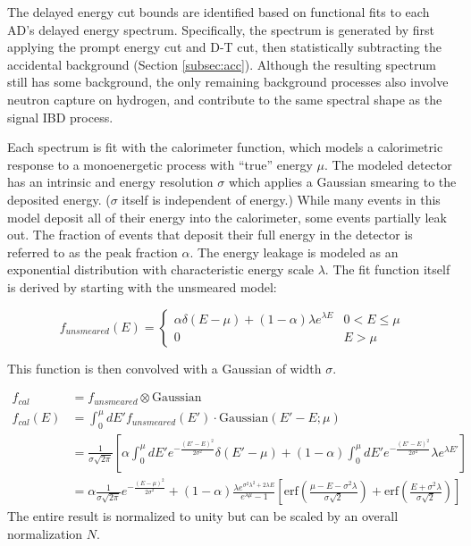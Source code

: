 \documentclass{ucbthesis}
\begin{document}
The delayed energy cut bounds are identified based on
functional fits to each AD's delayed energy spectrum.
Specifically, the spectrum is generated by first applying
the prompt energy cut and D-T cut,
then statistically subtracting the accidental background (Section \ref{subsec:acc}).
Although the resulting spectrum still has some background,
the only remaining background processes also involve
neutron capture on hydrogen, and contribute to the same spectral shape
as the signal IBD process.

Each spectrum is fit with the calorimeter function, which models
a calorimetric response to a monoenergetic process with ``true''
energy $\mu$.
The modeled detector has an intrinsic and energy resolution $\sigma$
which applies a Gaussian smearing to the deposited energy.
($\sigma$ itself is independent of energy.)
While many events in this model deposit all of their energy into
the calorimeter, some events partially leak out.
The fraction of events that deposit their full energy in the detector
is referred to as the peak fraction $\alpha$.
The energy leakage is modeled as an exponential distribution
with characteristic energy scale $\lambda$.
The fit function itself is derived by starting with
the unsmeared model:

\begin{equation*}
    f_{unsmeared}(E) =
    \begin{cases}
        \alpha\delta(E-\mu) + (1-\alpha)\lambda e^{\lambda E}
        & 0 < E \leq \mu \\
        0 & E > \mu
    \end{cases}
\end{equation*}

This function is then convolved with a Gaussian
of width $\sigma$.

\begin{align*}
    f_{cal}    &= f_{unsmeared} \otimes \text{Gaussian} \\
    f_{cal}(E) &= \int_0^\mu dE' f_{unsmeared}(E') \cdot \text{Gaussian}(E'-E; \mu) \\
               &= \frac{1}{\sigma\sqrt{2\pi}}
               \left[
                   \alpha\int_0^\mu dE' e^{-\frac{(E'-E)^2}{2\sigma^2}} \delta(E'-\mu)
                   + (1-\alpha)\int_0^\mu dE' e^{-\frac{(E'-E)^2}{2\sigma^2}}
                   \lambda e^{\lambda E'}
               \right] \\
               &= \alpha\frac{1}{\sigma\sqrt{2\pi}}e^{-\frac{(E-\mu)^2}{2\sigma^2}}
               + (1-\alpha)
               \frac{\lambda e^{\sigma^2\lambda^2+2\lambda E}}{e^{\lambda\mu}-1}
               \left[
                   \text{erf}
                   \left(
                       \frac{\mu-E-\sigma^2\lambda}{\sigma\sqrt{2}}
                   \right)
                   + \text{erf}
                   \left(
                       \frac{E + \sigma^2\lambda}{\sigma\sqrt{2}}
                   \right)
               \right]
\end{align*}
The entire result is normalized to unity
but can be scaled by an overall normalization $N$.
\end{document}
